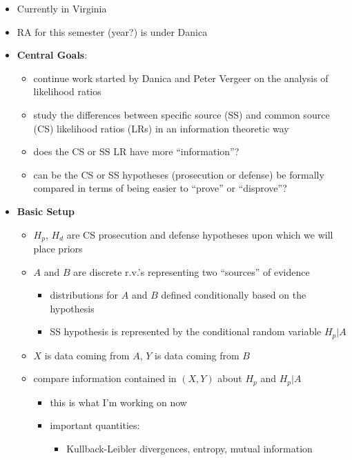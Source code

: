 \documentclass[]{book}
\providecommand{\tightlist}{%
  \setlength{\itemsep}{0pt}\setlength{\parskip}{0pt}}
\begin{document}
\begin{itemize}
\tightlist
\item
  Currently in Virginia
\item
  RA for this semester (year?) is under Danica
\item
  \textbf{Central Goals}:

  \begin{itemize}
  \tightlist
  \item
    continue work started by Danica and Peter Vergeer on the analysis of likelihood ratios
  \item
    study the differences between specific source (SS) and common source (CS) likelihood ratios (LRs) in an information theoretic way
  \item
    does the CS or SS LR have more ``information''?
  \item
    can be the CS or SS hypotheses (prosecution or defense) be formally compared in terms of being easier to ``prove'' or ``disprove''?
  \end{itemize}
\item
  \textbf{Basic Setup}

  \begin{itemize}
  \tightlist
  \item
    \(H_p\), \(H_d\) are CS prosecution and defense hypotheses upon which we will place priors\\
  \item
    \(A\) and \(B\) are discrete r.v.'s representing two ``sources'' of evidence

    \begin{itemize}
    \tightlist
    \item
      distributions for \(A\) and \(B\) defined conditionally based on the hypothesis
    \item
      SS hypothesis is represented by the conditional random variable \(H_p|A\)
    \end{itemize}
  \item
    \(X\) is data coming from \(A\), \(Y\) is data coming from \(B\)
  \item
    compare information contained in \((X,Y)\) about \(H_p\) and \(H_p|A\)

    \begin{itemize}
    \tightlist
    \item
      this is what I'm working on now
    \item
      important quantities:

      \begin{itemize}
      \tightlist
      \item
        Kullback-Leibler divergences, entropy, mutual information
      \end{itemize}
    \end{itemize}
  \end{itemize}
\end{itemize}
\end{document}
